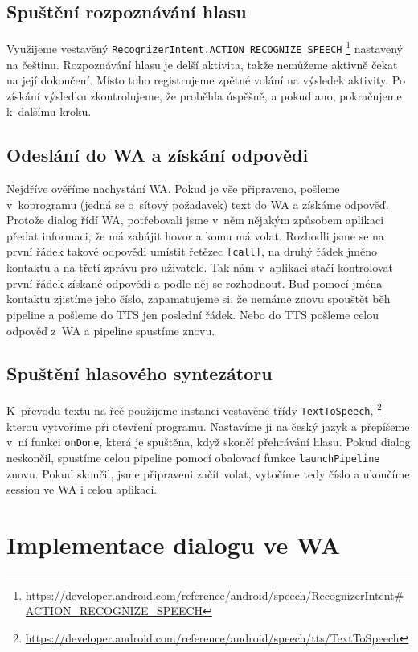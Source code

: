 \subsection{Spuštění rozpoznávání hlasu}\label{start-tts}

Využijeme vestavěný \texttt{RecognizerIntent.ACTION\_RECOGNIZE\_SPEECH}%
\footnote{\url{https://developer.android.com/reference/android/speech/RecognizerIntent\#ACTION\_RECOGNIZE\_SPEECH}}
nastavený na češtinu. Rozpoznávání hlasu je delší aktivita, takže nemůžeme
aktivně čekat na její
dokončení. Místo toho registrujeme zpětné volání na výsledek aktivity.
Po získání výsledku zkontrolujeme, že proběhla úspěšně, a pokud ano, pokračujeme
k~dalšímu kroku.

\subsection{Odeslání do WA a získání odpovědi}\label{contact-wa}
Nejdříve ověříme nachystání WA. Pokud je vše připraveno,
pošleme v~koprogramu (jedná se o~síťový požadavek) text do WA a získáme odpověď.
Protože dialog řídí WA, potřebovali jsme v~něm nějakým způsobem aplikaci
předat informaci, že má zahájit hovor a komu má volat. Rozhodli jsme se na první
řádek takové odpovědi umístit řetězec \texttt{[call]}, na druhý řádek jméno kontaktu
a na třetí zprávu pro uživatele. Tak nám v~aplikaci stačí kontrolovat první řádek získané
odpovědi a podle něj se rozhodnout. Buď pomocí jména kontaktu zjistíme jeho číslo, zapamatujeme
si, že nemáme znovu spouštět běh pipeline a pošleme do TTS jen poslední řádek.
Nebo do TTS pošleme celou odpověď z~WA a pipeline spustíme znovu.

\subsection{Spuštění hlasového syntezátoru}\label{start-tts}

K~převodu textu na řeč použijeme instanci vestavěné
třídy \texttt{TextToSpeech},%
\footnote{\url{https://developer.android.com/reference/android/speech/tts/TextToSpeech}}
kterou vytvoříme při otevření programu. Nastavíme
ji na český jazyk a přepíšeme v~ní funkci \texttt{onDone}, která je spuštěna,
když skončí přehrávání hlasu. Pokud dialog neskončil, spustíme celou pipeline
pomocí obalovací funkce \texttt{launchPipeline} znovu. Pokud
skončil, jsme připraveni začít volat, vytočíme tedy číslo a ukončíme session ve
WA i celou aplikaci.

\section{Implementace dialogu ve WA}\label{wainit}

